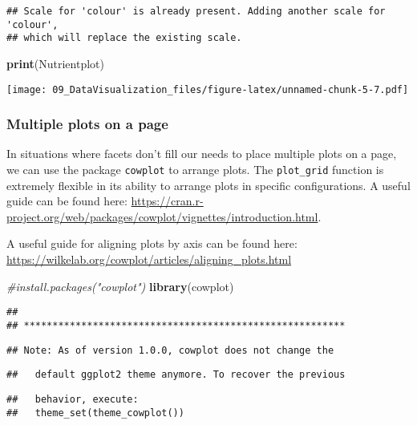 \documentclass[]{article}
\newenvironment{Shaded}{\begin{snugshade}}{\end{snugshade}}
\newcommand{\KeywordTok}[1]{\textcolor[rgb]{0.13,0.29,0.53}{\textbf{#1}}}
\newcommand{\CommentTok}[1]{\textcolor[rgb]{0.56,0.35,0.01}{\textit{#1}}}
\newcommand{\NormalTok}[1]{#1}
\begin{document}
\begin{verbatim}
## Scale for 'colour' is already present. Adding another scale for 'colour',
## which will replace the existing scale.
\end{verbatim}

\begin{Shaded}
\begin{Highlighting}[]
\KeywordTok{print}\NormalTok{(Nutrientplot)}
\end{Highlighting}
\end{Shaded}

\texttt{[image: 09\_DataVisualization\_files/figure-latex/unnamed-chunk-5-7.pdf]}

\subsubsection{Multiple plots on a page}\label{multiple-plots-on-a-page}

In situations where facets don't fill our needs to place multiple plots
on a page, we can use the package \texttt{cowplot} to arrange plots. The
\texttt{plot\_grid} function is extremely flexible in its ability to
arrange plots in specific configurations. A useful guide can be found
here:
\url{https://cran.r-project.org/web/packages/cowplot/vignettes/introduction.html}.

A useful guide for aligning plots by axis can be found here:
\url{https://wilkelab.org/cowplot/articles/aligning_plots.html}

\begin{Shaded}
\begin{Highlighting}[]
\CommentTok{#install.packages("cowplot")}
\KeywordTok{library}\NormalTok{(cowplot)}
\end{Highlighting}
\end{Shaded}

\begin{verbatim}
## 
## ********************************************************
\end{verbatim}

\begin{verbatim}
## Note: As of version 1.0.0, cowplot does not change the
\end{verbatim}

\begin{verbatim}
##   default ggplot2 theme anymore. To recover the previous
\end{verbatim}

\begin{verbatim}
##   behavior, execute:
##   theme_set(theme_cowplot())
\end{verbatim}
\end{document}
